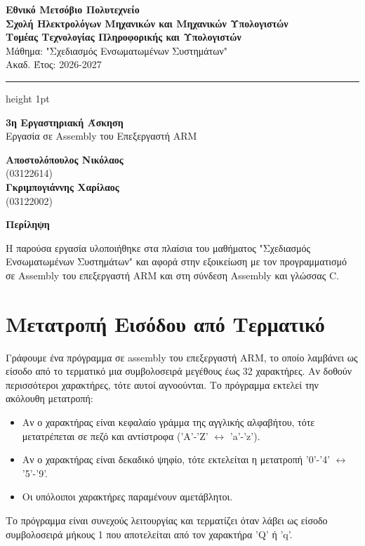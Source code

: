 \documentclass[12pt]{article}
\begin{document}
\noindent
\begin{minipage}[t]{\textwidth}
    {\large \textbf{Εθνικό Μετσόβιο Πολυτεχνείο}} \\
    \textbf{Σχολή Ηλεκτρολόγων Μηχανικών και Μηχανικών Υπολογιστών} \\    
    \textbf{Τομέας Τεχνολογίας Πληροφορικής και Υπολογιστών} \\
    Μάθημα: "Σχεδιασμός Ενσωματωμένων Συστημάτων" \\
    Ακαδ. Έτος: 2026-2027
\end{minipage}

\vspace{0.2cm}
\hrule height 1pt
\vspace{1cm}


\begin{center}
    {\LARGE \textbf{3η Εργαστηριακή Άσκηση}} \\[0.5cm]
    {\large Εργασία σε Assembly του Επεξεργαστή ARM}
\end{center}
\vspace{1cm}


\begin{center}
	\textbf{Αποστολόπουλος Νικόλαος} \\
	(03122614) \\
	\textbf{Γκριμπογιάννης Χαρίλαος} \\
	(03122002)
\end{center}
\vspace{1cm}

\begin{center}
    \textbf{\large Περίληψη}
\end{center}

\noindent
Η παρούσα εργασία υλοποιήθηκε στα πλαίσια του μαθήματος "Σχεδιασμός Ενσωματωμένων Συστημάτων" και αφορά στην εξοικείωση με τον προγραμματισμό σε Assembly του επεξεργαστή ARM και στη σύνδεση Assembly και γλώσσας C.
\pagebreak

\tableofcontents
\pagebreak

\section{Μετατροπή Εισόδου από Τερματικό}
Γράφουμε ένα πρόγραμμα σε assembly του επεξεργαστή ARM, το οποίο λαμβάνει ως είσοδο από το τερματικό μια συμβολοσειρά μεγέθους έως 32 χαρακτήρες. Αν δοθούν περισσότεροι χαρακτήρες, τότε αυτοί αγνοούνται. Το πρόγραμμα εκτελεί την ακόλουθη μετατροπή:
\begin{itemize}
\item Αν ο χαρακτήρας είναι κεφαλαίο γράμμα της αγγλικής αλφαβήτου, τότε μετατρέπεται σε πεζό και αντίστροφα ('A'-'Z' $\leftrightarrow$ 'a'-'z').
\item Αν ο χαρακτήρας είναι δεκαδικό ψηφίο, τότε εκτελείται η μετατροπή '0'-'4' $\leftrightarrow$ '5'-'9'.
\item Οι υπόλοιποι χαρακτήρες παραμένουν αμετάβλητοι.
\end{itemize}
Το πρόγραμμα είναι συνεχούς λειτουργίας και τερματίζει όταν λάβει ως είσοδο συμβολοσειρά μήκους 1 που αποτελείται από τον χαρακτήρα 'Q' ή 'q'.
\end{document}
